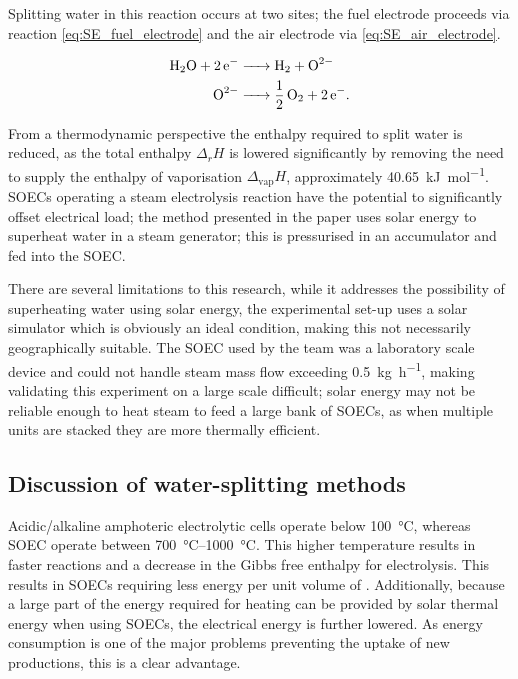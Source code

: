 Splitting water in this reaction occurs at two sites; the fuel electrode proceeds via reaction \eqref{eq:SE_fuel_electrode} and the air electrode via \eqref{eq:SE_air_electrode}.\cite{Schiller2019}

\begin{align}
	\ce{H2O + 2e- &-> H2 +O^2-}\label{eq:SE_fuel_electrode}\\
	\ce{O^2- &-> 1/2O2 + 2e-}\label{eq:SE_air_electrode}
.\end{align}

From a thermodynamic perspective the enthalpy required to split water is reduced, as the total enthalpy $\Delta_{r}H$ is lowered significantly by removing the need to supply the enthalpy of vaporisation $\Delta_{\text{vap}}H$, approximately \SI{40.65}{\kilo\joule\per\mole}\cite{Lemmon2017}.
SOECs operating a steam electrolysis reaction have the potential to significantly offset electrical load; the method presented in the paper uses solar energy to superheat water in a steam generator; this is pressurised in an accumulator and fed into the SOEC. 

There are several limitations to this research, while it addresses the possibility of superheating water using solar energy, the experimental set-up uses a solar simulator which is obviously an ideal condition, making this not necessarily geographically suitable.
The SOEC used by the team was a laboratory scale device and could not handle steam mass flow exceeding \SI{0.5}{\kilo\gram\per\hour}, making validating this experiment on a large scale difficult; solar energy may not be reliable enough to heat steam to feed a large bank of SOECs, as when multiple units are stacked they are more thermally efficient.

\subsection{Discussion of water-splitting methods}%
\label{sub:discussion_of_water_splitting_methods}
Acidic/alkaline amphoteric  electrolytic cells operate below \SI{100}{\celsius}\cite{Lei2019}, whereas SOEC operate between \SIrange{700}{1000}{\celsius}\cite{Schiller2019}.
This higher temperature results in faster reactions and a decrease in the Gibbs free enthalpy for  electrolysis.
This results in SOECs requiring less energy per unit volume of .
Additionally, because a large part of the energy required for heating can be provided by solar thermal energy when using SOECs, the electrical energy is further lowered.
As energy consumption is one of the major problems preventing the uptake of new  productions, this is a clear advantage.

